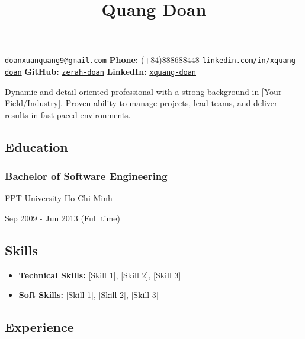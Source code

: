 \documentclass[11pt,a4paper]{article}
\title{\textcolor{devblue}{\large Quang Doan}}
\author{}
\date{}
\providecommand{\tightlist}{%
  \setlength{\itemsep}{0pt}\setlength{\parskip}{0pt}}
\begin{document}
\maketitle

\vspace{-1em}
\noindent\href{mailto:doanxuanquang9@gmail.com}{\texttt{doanxuanquang9@gmail.com}} \hspace{1em}
\textbf{Phone:} (+84)888688448 \hspace{1em}
\href{https://linkedin.com/in/xquang-doan}{\texttt{linkedin.com/in/xquang-doan}} \hspace{1em}
\textbf{GitHub:} \href{https://github.com/zerah-doan}{\texttt{zerah-doan}} \hspace{1em}
\textbf{LinkedIn:} \href{https://linkedin.com/in/xquang-doan}{\texttt{xquang-doan}}

\vspace{1em}

Dynamic and detail-oriented professional with a strong background in
{[}Your Field/Industry{]}. Proven ability to manage projects, lead
teams, and deliver results in fast-paced environments.

\subsection{Education}\label{education}

\subsubsection{Bachelor of Software
Engineering}\label{bachelor-of-software-engineering}

FPT University Ho Chi Minh

Sep 2009 - Jun 2013 (Full time)

\subsection{Skills}\label{skills}

\begin{itemize}
\tightlist
\item
  \textbf{Technical Skills:} {[}Skill 1{]}, {[}Skill 2{]}, {[}Skill 3{]}
\item
  \textbf{Soft Skills:} {[}Skill 1{]}, {[}Skill 2{]}, {[}Skill 3{]}
\end{itemize}

\subsection{Experience}\label{experience}
\end{document}
